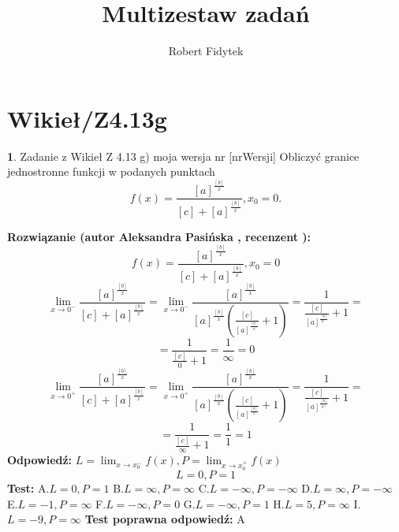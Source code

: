 \documentclass[12pt, a4paper]{article}
\title{Multizestaw zadań}
\author{Robert Fidytek}
\date{}
\theoremstyle{definition} %
\newtheorem{zad}{}
\newcommand{\kategoria}[1]{\section{#1}} %
\newcommand{\zadStart}[1]{\begin{zad}#1\newline} %
\newcommand{\zadStop}{\end{zad}}   %
\newcommand{\rozwStart}[2]{\noindent \textbf{Rozwiązanie (autor #1 , recenzent #2): }\newline} %
\newcommand{\rozwStop}{\newline}                                            %
\newcommand{\odpStart}{\noindent \textbf{Odpowiedź:}\newline}    %
\newcommand{\odpStop}{\newline}                                             %
\newcommand{\testStart}{\noindent \textbf{Test:}\newline} %
\newcommand{\testStop}{\newline} %
\newcommand{\kluczStart}{\noindent \textbf{Test poprawna odpowiedź:}\newline} %
\newcommand{\kluczStop}{\newline} %
\begin{document}
\maketitle


\kategoria{Wikieł/Z4.13g}
\zadStart{Zadanie z Wikieł Z 4.13 g) moja wersja nr [nrWersji]}
Obliczyć granice jednostronne funkcji w podanych punktach $$f(x)=\frac{[a]^{\frac{[b]}{x}}}{[c]+[a]^{\frac{[b]}{x}}},x_{0}=0.$$
\zadStop
\rozwStart{Aleksandra Pasińska}{}
$$f(x)=\frac{[a]^{\frac{[b]}{x}}}{[c]+[a]^{\frac{[b]}{x}}},x_{0}=0$$
$$\lim_{x\rightarrow 0^-}\frac{[a]^{\frac{[b]}{x}}}{[c]+[a]^{\frac{[b]}{x}}}=\lim_{x\rightarrow 0^-}\frac{[a]^{\frac{[b]}{x}}}{[a]^{\frac{[b]}{x}}(\frac{[c]}{[a]^{\frac{[b]}{x}}}+1)}=\frac{1}{\frac{[c]}{[a]^{\frac{[b]}{0^-}}}+1}=$$ 
$$=\frac{1}{\frac{[c]}{0}+1}=\frac{1}{\infty}=0$$ 
$$\lim_{x\rightarrow 0^+}\frac{[a]^{\frac{[b]}{x}}}{[c]+[a]^{\frac{[b]}{x}}}=\lim_{x\rightarrow 0^+}\frac{[a]^{\frac{[b]}{x}}}{[a]^{\frac{[b]}{x}}(\frac{[c]}{[a]^{\frac{[b]}{x}}}+1)}=\frac{1}{\frac{[c]}{[a]^{\frac{[b]}{0^+}}}+1}=$$ 
$$=\frac{1}{\frac{[c]}{\infty}+1}=\frac{1}{1}=1$$
\rozwStop
\odpStart
$ L=\lim_{x\rightarrow x_{0}^-}f(x), P=\lim_{x\rightarrow x_{0}^+}f(x)$
$$L=0, P=1$$
\odpStop
\testStart
A.$ L=0, P=1 $
B.$L=\infty, P=\infty$
C.$L=-\infty, P=-\infty$
D.$L=\infty, P=-\infty$
E.$L=-1, P=\infty$
F.$L=-\infty, P=0$
G.$L=-\infty, P=1$
H.$L=5, P=\infty$
I.$L=-9, P=\infty$
\testStop
\kluczStart
A
\kluczStop
\end{document}
